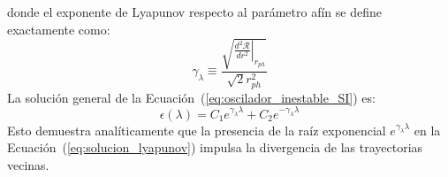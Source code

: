 donde el exponente de Lyapunov respecto al parámetro afín se define exactamente como:
\begin{equation}
    \gamma_\lambda \equiv \frac{\sqrt{\left.\frac{d^2\mathcal{R}}{dr^2}\right|_{r_{ph}}}}{\sqrt{2} r_{ph}^2}
    \label{eq:def_lyapunov_SI}
\end{equation}
La solución general de la Ecuación~(\ref{eq:oscilador_inestable_SI}) es:
\begin{equation}
    \epsilon(\lambda) = C_1 e^{\gamma_\lambda \lambda} + C_2 e^{-\gamma_\lambda \lambda}
    \label{eq:solucion_lyapunov}
\end{equation}
Esto demuestra analíticamente que la presencia de la raíz exponencial $e^{\gamma_\lambda \lambda}$ en la Ecuación~(\ref{eq:solucion_lyapunov}) impulsa la divergencia de las trayectorias vecinas.

